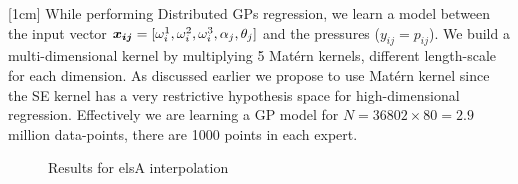 [1cm]
While performing Distributed GPs regression, we learn a model between the input vector $\boldsymbol{x_{ij}} = [\omega_{i}^{1}, \omega_{i}^{2}, \omega_{i}^{3}, \alpha_j, \theta_j]$ and the pressures ($y_{ij} = p_{ij}$). We build a multi-dimensional kernel by multiplying 5 Mat\'ern kernels, different length-scale for each dimension. As discussed earlier we propose to use Mat\'ern kernel since the SE kernel has a very restrictive hypothesis space for high-dimensional regression.  Effectively we are learning a GP model for $N = 36802\times80 = 2.9$ million data-points, there are 1000 points in each expert. 

\begin{figure}[!ht]
  \centering
  \quad
  \caption{Results for elsA interpolation}
  \label{fig:FTF_CFDresults}
\end{figure}

